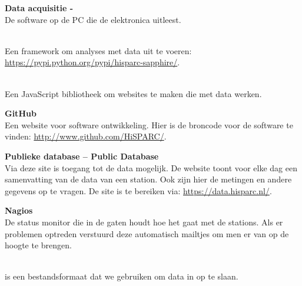 \textbf{Data acquisitie - \hisparc\daq} \\
De software op de \hisparc PC die de \hisparc elektronica uitleest.

\textbf{\sapphire} \\
Een \python framework om analyses met \hisparc data uit te voeren:
\url{https://pypi.python.org/pypi/hisparc-sapphire/}.

\textbf{\jsparc} \\
Een JavaScript bibliotheek om websites te maken die met \hisparc data
werken.

\textbf{GitHub} \\
Een website voor software ontwikkeling. Hier is de broncode voor de
\hisparc software te vinden: \url{http://www.github.com/HiSPARC/}.

\textbf{Publieke database -- Public Database} \\
Via deze site is toegang tot de \hisparc data mogelijk. De website toont
voor elke dag een samenvatting van de data van een station. Ook zijn
hier de metingen en andere gegevens op te vragen. De site is te bereiken
via: \url{https://data.hisparc.nl/}.

\textbf{Nagios} \\
De status monitor die in de gaten houdt hoe het gaat met de stations.
Als er problemen optreden verstuurd deze automatisch mailtjes om men er
van op de hoogte te brengen.

\textbf{\hdf} \\
\hdf is een bestandsformaat dat we gebruiken om data in op te slaan.


